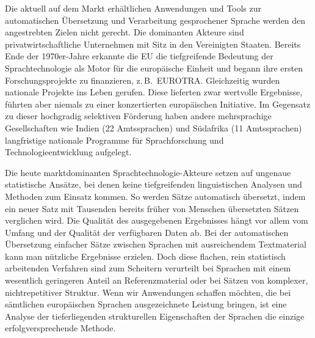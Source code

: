\documentclass[]{../../metanetpaper}
\begin{document}
\begin{multicols}{2}
Die aktuell auf dem Markt erhältlichen Anwendungen und Tools zur automatischen Übersetzung und Verarbeitung gesprochener Sprache werden den angestrebten Zielen nicht gerecht. Die dominanten Akteure sind privatwirtschaftliche Unternehmen mit Sitz in den Vereinigten Staaten. Bereits Ende der 1970er-Jahre erkannte die EU die tiefgreifende Bedeutung der Sprachtechnologie als Motor für die europäische Einheit und begann ihre ersten Forschungsprojekte zu finanzieren, z.\,B.~EUROTRA. Gleichzeitig wurden nationale Projekte ins Leben gerufen. Diese lieferten zwar wertvolle Ergebnisse, führten aber niemals zu einer konzertierten europäischen Initiative. Im Gegensatz zu dieser hochgradig selektiven Förderung haben andere mehrsprachige Gesellschaften wie Indien (22 Amtssprachen) und Südafrika (11 Amtssprachen) langfristige nationale Programme für Sprachforschung und Technologieentwicklung aufgelegt.


Die heute marktdominanten Sprach\-tech\-no\-logie-Ak\-teu\-re setzen auf ungenaue statistische Ansätze, bei denen keine tiefgreifenden linguistischen Analysen und Methoden zum Einsatz kommen. So werden Sätze automatisch übersetzt, indem ein neuer Satz mit Tausenden bereits früher von Menschen übersetzten Sätzen verglichen wird. Die Qualität des ausgegebenen Ergebnisses hängt vor allem vom Umfang und der Qualität der verfügbaren Daten ab. Bei der automatischen Übersetzung einfacher Sätze zwischen Sprachen mit ausreichendem Textmaterial kann man nützliche Ergebnisse erzielen. Doch diese flachen, rein statistisch arbeitenden Verfahren sind zum Scheitern verurteilt bei Sprachen mit einem wesentlich geringeren Anteil an Referenzmaterial oder bei Sätzen von komplexer, nichtrepetitiver Struktur. Wenn wir Anwendungen schaffen möchten, die bei sämtlichen europäischen Sprachen ausgezeichnete Leistung bringen, ist eine Analyse der tieferliegenden strukturellen Eigenschaften der Sprachen die einzige erfolgversprechende Methode.


\end{multicols}
\end{document}
